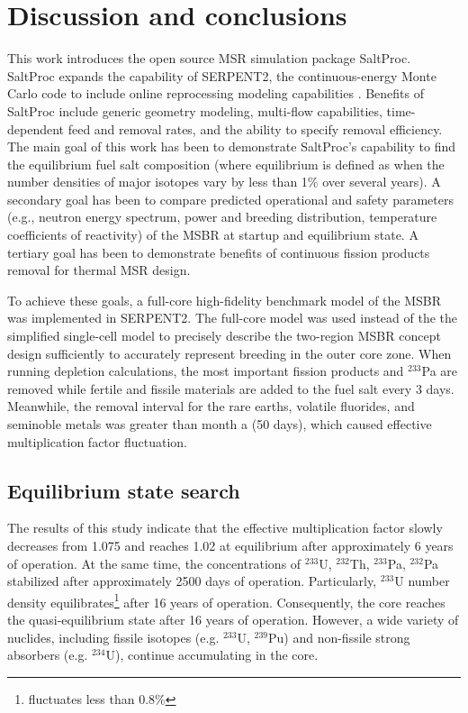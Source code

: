 \section{Discussion and conclusions}

This work introduces the open source \gls{MSR} simulation package SaltProc. 
SaltProc expands the capability of SERPENT2, the continuous-energy Monte Carlo 
code to include online reprocessing modeling capabilities 
\cite{rykhlevskii_arfc/saltproc:_2018}. Benefits of SaltProc include 
generic geometry modeling, multi-flow capabilities, time-dependent feed and 
removal rates, and the ability to specify removal efficiency. The main goal of 
this work has 
been to demonstrate SaltProc's capability to find the equilibrium fuel salt 
composition (where equilibrium is defined as when the number densities of major 
isotopes vary by less than 1\% over several years). A secondary goal has been to 
compare predicted operational and safety parameters (e.g., neutron energy 
spectrum, power and breeding distribution, temperature coefficients of 
reactivity) of the \gls{MSBR} at startup and equilibrium state. A tertiary goal 
has been to demonstrate benefits of continuous fission products removal for 
thermal \gls{MSR} design.

To achieve these goals, a full-core high-fidelity benchmark model of the \gls{MSBR} 
was implemented in SERPENT2. The full-core model was used instead of the 
the simplified single-cell model \cite{betzler_molten_2017, 
rykhlevskii_online_2017, betzler_fuel_2018} to precisely describe the 
two-region \gls{MSBR} concept design sufficiently to accurately represent 
breeding in the outer core zone. When running depletion calculations, the most 
important fission products and $^{233}$Pa are removed while fertile and fissile 
materials are added to the fuel salt every 3 days.  Meanwhile, the removal 
interval for the rare earths, volatile fluorides, and seminoble metals was greater 
than month a (50 days), which caused effective multiplication factor fluctuation. 

\subsection{Equilibrium state search}
The results of this study indicate that the effective multiplication factor 
slowly decreases from 1.075 and reaches 1.02 at equilibrium after approximately 
6 years of operation. At the same time, the concentrations of $^{233}$U, $^{232}$Th, 
$^{233}$Pa, $^{232}$Pa stabilized after approximately 2500 days of operation. 
Particularly, $^{233}$U number density equilibrates\footnote{fluctuates less 
than 0.8\%} after 16 years of operation. Consequently, the core reaches the quasi-equilibrium state after 16 years of operation. However, a wide variety of nuclides, 
including fissile isotopes (e.g. $^{233}$U, $^{239}$Pu) and non-fissile strong 
absorbers (e.g. $^{234}$U), continue accumulating in the core. 

